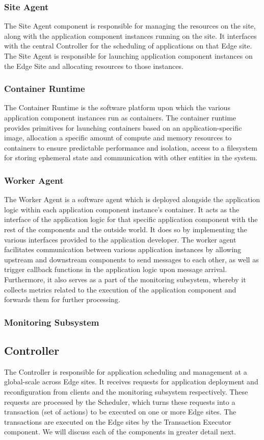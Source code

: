 \subsubsection{Site Agent}
The Site Agent component is responsible for managing the resources on the site, along with the application component instances running on the site. It interfaces with the central Controller for the scheduling of applications on that Edge site. The Site Agent is responsible for launching application component instances on the Edge Site and allocating resources to those instances.

\subsubsection{Container Runtime}
The Container Runtime is the software platform upon which the various application component instances run as containers. The container runtime provides primitives for launching containers based on an application-specific image, allocation a specific amount of compute and memory resources to containers to ensure predictable performance and isolation, access to a filesystem for storing ephemeral state and communication with other entities in the system. 

\subsubsection{Worker Agent}
The Worker Agent is a software agent which is deployed alongside the application logic within each application component instance's container. It acts as the interface of the application logic for that specific application component with the rest of the components and the outside world. It does so by implementing the various interfaces provided to the application developer. The worker agent facilitates communication between various application instances by allowing upstream and downstream components to send messages to each other, as well as trigger callback functions in the application logic upon message arrival. Furthermore, it also serves as a part of the monitoring subsystem, whereby it collects metrics related to the execution of the application component and forwards them for further processing.
\subsubsection{Monitoring Subsystem}

\subsection{Controller}
The Controller is responsible for application scheduling and management at a global-scale across Edge sites. It receives requests for application deployment and reconfiguration from clients and the monitoring subsystem respectively. These requests are processed by the Scheduler, which turns these requests into a transaction (set of actions) to be executed on one or more Edge sites. The transactions are executed on the Edge sites by the Transaction Executor component. We will discuss each of the components in greater detail next.
